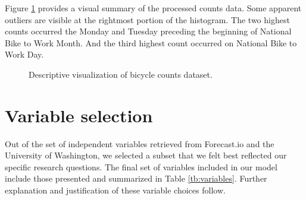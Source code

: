 \documentclass[12pt,letterpaper,article]{memoir}
\begin{document}
Figure \ref{fg:descriptives} provides a visual summary of the processed
counts data. Some apparent outliers are visible at the rightmost
portion of the histogram. The two highest counts occurred the Monday
and Tuesday preceding the beginning of National Bike to Work
Month. And the third highest count occurred on National Bike to Work
Day.

\begin{figure}[ht!]
  \centering
  \hfill
  \caption{Descriptive visualization of bicycle counts dataset.}
  \label{fg:descriptives}
\end{figure}


\FloatBarrier
\section*{Variable selection}
% 
% 

Out of the set of independent variables retrieved from Forecast.io and
the University of Washington, we selected a subset that we felt best
reflected our specific research questions. The final set of variables
included in our model include those presented and summarized in Table
\ref{tb:variables}. Further explanation and justification of these
variable choices follow.
\end{document}
